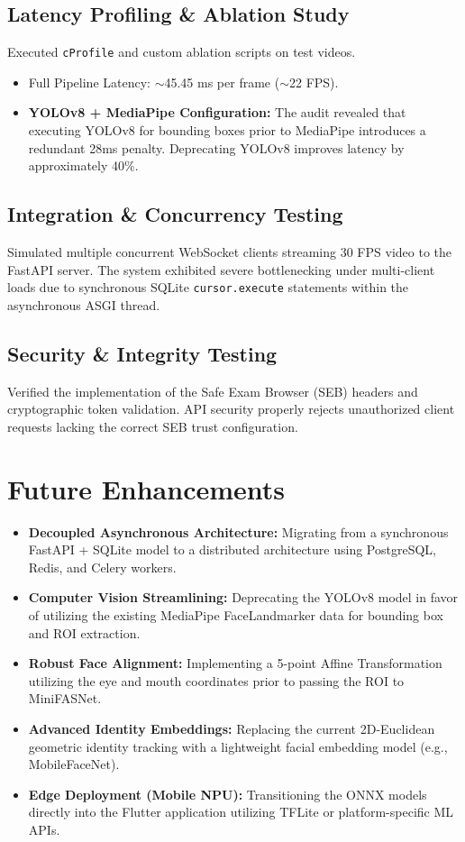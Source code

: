 \documentclass[12pt, a4paper]{report}
\begin{document}
\section{Latency Profiling \& Ablation Study}
Executed \texttt{cProfile} and custom ablation scripts on test videos.
\begin{itemize}
    \item Full Pipeline Latency: $\sim$45.45 ms per frame ($\sim$22 FPS).
    \item \textbf{YOLOv8 + MediaPipe Configuration:} The audit revealed that executing YOLOv8 for bounding boxes prior to MediaPipe introduces a redundant 28ms penalty. Deprecating YOLOv8 improves latency by approximately 40\%.
\end{itemize}

\section{Integration \& Concurrency Testing}
Simulated multiple concurrent WebSocket clients streaming 30 FPS video to the FastAPI server. The system exhibited severe bottlenecking under multi-client loads due to synchronous SQLite \texttt{cursor.execute} statements within the asynchronous ASGI thread.

\section{Security \& Integrity Testing}
Verified the implementation of the Safe Exam Browser (SEB) headers and cryptographic token validation. API security properly rejects unauthorized client requests lacking the correct SEB trust configuration.

\fi
\chapter{Future Enhancements}
\begin{itemize}
    \item \textbf{Decoupled Asynchronous Architecture:} Migrating from a synchronous FastAPI + SQLite model to a distributed architecture using PostgreSQL, Redis, and Celery workers.
    \item \textbf{Computer Vision Streamlining:} Deprecating the YOLOv8 model in favor of utilizing the existing MediaPipe FaceLandmarker data for bounding box and ROI extraction.
    \item \textbf{Robust Face Alignment:} Implementing a 5-point Affine Transformation utilizing the eye and mouth coordinates prior to passing the ROI to MiniFASNet.
    \item \textbf{Advanced Identity Embeddings:} Replacing the current 2D-Euclidean geometric identity tracking with a lightweight facial embedding model (e.g., MobileFaceNet).
    \item \textbf{Edge Deployment (Mobile NPU):} Transitioning the ONNX models directly into the Flutter application utilizing TFLite or platform-specific ML APIs.
\end{itemize}
\end{document}
